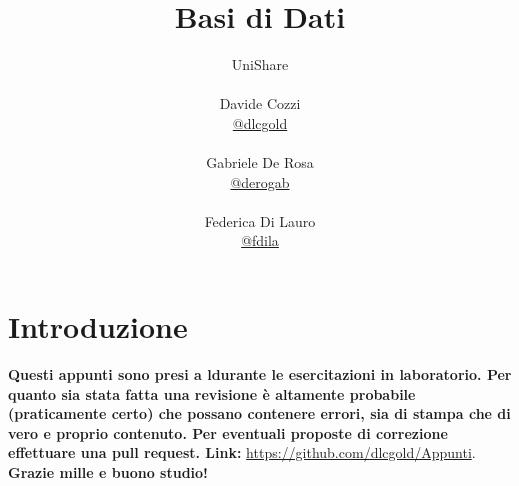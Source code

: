 \documentclass[a4paper,12pt, oneside]{book}
\title{Basi di Dati}
\author{UniShare\\\\Davide Cozzi\\\href{https://t.me/dlcgold}{@dlcgold}\\\\Gabriele De Rosa\\\href{https://t.me/derogab}{@derogab} \\\\Federica Di Lauro\\\href{https://t.me/f_dila}{@f\textunderscore dila}}
\date{}
\begin{document}
\maketitle


\newtheorem{teorema}{Teorema}
\newtheorem{definizione}{Definizione}
\newtheorem{esempio}{Esempio}
\newtheorem{corollario}{Corollario}
\newtheorem{lemma}{Lemma}
\newtheorem{osservazione}{Osservazione}
\newtheorem{nota}{Nota}
\newtheorem{esercizio}{Esercizio}
\tableofcontents
\renewcommand{\chaptermark}[1]{%
\markboth{\chaptername
\ \thechapter.\ #1}{}}
\renewcommand{\sectionmark}[1]{\markright{\thesection.\ #1}}
\chapter{Introduzione}
\textbf{Questi appunti sono presi a ldurante le esercitazioni in laboratorio. Per quanto sia stata fatta una revisione è altamente probabile (praticamente certo) che possano contenere errori, sia di stampa che di vero e proprio contenuto. Per eventuali proposte di correzione effettuare una pull request. Link: } \url{https://github.com/dlcgold/Appunti}.\\
\textbf{Grazie mille e buono studio!}
\end{document}

